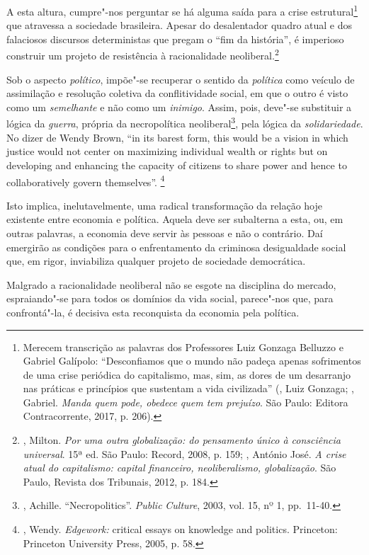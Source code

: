 A esta altura, cumpre"-nos perguntar se há alguma saída para a crise
estrutural\footnote{Merecem transcrição as palavras dos Professores Luiz
  Gonzaga Belluzzo e Gabriel Galípolo: ``Desconfiamos que o mundo não
  padeça apenas sofrimentos de uma crise periódica do capitalismo, mas,
  sim, as dores de um desarranjo nas práticas e princípios que sustentam
  a vida civilizada'' (, Luiz Gonzaga; , Gabriel.
  \emph{Manda quem pode, obedece quem tem prejuízo}. São Paulo: Editora
  Contracorrente, 2017, p. 206).} que atravessa a sociedade brasileira.
Apesar do desalentador quadro atual e dos falaciosos discursos
deterministas que pregam o ``fim da história'', é imperioso construir um
projeto de resistência à racionalidade neoliberal.\footnote{,
  Milton. \emph{Por uma outra globalização: do pensamento único à
  consciência universal}. 15ª ed. São Paulo: Record, 2008, p. 159;
  , António José. \emph{A crise atual do capitalismo:
  capital financeiro, neoliberalismo, globalização}. São Paulo, Revista
  dos Tribunais, 2012, p. 184.}

Sob o aspecto \emph{político}, impõe"-se recuperar o sentido da
\emph{política} como veículo de assimilação e resolução coletiva da
conflitividade social, em que o outro é visto como um \emph{semelhante}
e não como um \emph{inimigo}. Assim, pois, deve"-se substituir a lógica
da \emph{guerra}, própria da necropolítica neoliberal\footnote{,
  Achille. ``Necropolitics''. \emph{Public} \emph{Culture}, 2003, vol.
  15, nº 1, pp.~11-40.}, pela lógica da \emph{solidariedade}. No dizer
de Wendy Brown, ``in its barest form, this would be a vision in which
justice would not center on maximizing individual wealth or rights but
on developing and enhancing the capacity of citizens to share power and
hence to collaboratively govern themselves''. \footnote{, Wendy.
  \emph{Edgework:} critical essays on knowledge and politics. Princeton:
  Princeton University Press, 2005, p. 58.}

Isto implica, inelutavelmente, uma radical transformação da relação hoje
existente entre economia e política. Aquela deve ser subalterna a esta,
ou, em outras palavras, a economia deve servir às pessoas e não o
contrário. Daí emergirão as condições para o enfrentamento da criminosa
desigualdade social que, em rigor, inviabiliza qualquer projeto de
sociedade democrática.

Malgrado a racionalidade neoliberal não se esgote na disciplina do
mercado, espraiando"-se para todos os domínios da vida social, parece"-nos
que, para confrontá"-la, é decisiva esta reconquista da economia pela
política.


